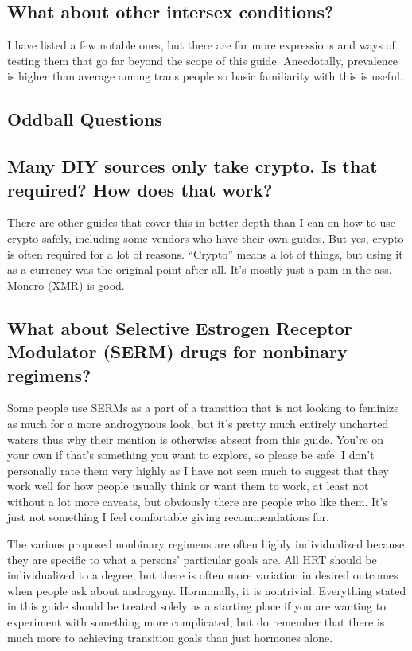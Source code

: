 \documentclass{article}
\begin{document}
\subsection{What about other intersex conditions?}

I have listed a few notable ones, but there are far more expressions and ways of testing them that go far beyond the scope of this guide. Anecdotally, prevalence is higher than average among trans people so basic familiarity with this is useful.

\subsection*{Oddball Questions}

\subsection{Many DIY sources only take crypto. Is that required? How does that work?}

There are other guides that cover this in better depth than I can on how to use crypto safely, including some vendors who have their own guides. But yes, crypto is often required for a lot of reasons. “Crypto” means a lot of things, but using it as a currency was the original point after all. It’s mostly just a pain in the ass. Monero (XMR) is good.

\subsection{What about Selective Estrogen Receptor Modulator (SERM) drugs for nonbinary regimens?}

Some people use SERMs as a part of a transition that is not looking to feminize as much for a more androgynous look, but it’s pretty much entirely uncharted waters thus why their mention is otherwise absent from this guide. You’re on your own if that’s something you want to explore, so please be safe. I don’t personally rate them very highly as I have not seen much to suggest that they work well for how people usually think or want them to work, at least not without a lot more caveats, but obviously there are people who like them. It's just not something I feel comfortable giving recommendations for.

The various proposed nonbinary regimens are often highly individualized because they are specific to what a persons' particular goals are. All HRT should be individualized to a degree, but there is often more variation in desired outcomes when people ask about androgyny. Hormonally, it is nontrivial. Everything stated in this guide should be treated solely as a starting place if you are wanting to experiment with something more complicated, but do remember that there is much more to achieving transition goals than just hormones alone.
\end{document}
